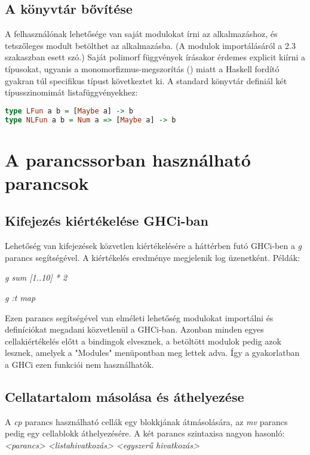 \subsection{A könyvtár bővítése}

A felhasználónak lehetősége van saját modulokat írni az alkalmazáshoz, és tetszőleges modult betölthet az alkalmazásba. (A modulok importálásáról a 2.3 szakaszban esett szó.) Saját polimorf függvények írásakor érdemes explicit kiírni a típusokat, ugyanis a monomorfizmus-megszorítás (\cite{monorestr}) miatt a Haskell fordító gyakran túl specifikus típust következtet ki. A standard könyvtár definiál két típusszinomimát listafüggvényekhez:

\begin{lstlisting}[caption={LFun és NLFun}, language={Haskell},label=src:lfun]
type LFun a b = [Maybe a] -> b
type NLFun a b = Num a => [Maybe a] -> b
\end{lstlisting}

\section{A parancssorban használható parancsok}

\subsection{Kifejezés kiértékelése GHCi-ban}

Lehetőség van kifejezések közvetlen kiértékelésére a háttérben futó GHCi-ben a \textit{g} parancs segítségével. A kiértékelés eredménye megjelenik log üzenetként. Példák:
\begin{compactenum}
	\item \textit{g sum [1..10] * 2}
	\item \textit{g :t map}
\end{compactenum}

Ezen parancs segítségével van elméleti lehetőség modulokat importálni és definíciókat megadani közvetlenül a GHCi-ban. Azonban minden egyes cellakiértékelés előtt a bindingok elvesznek, a betöltött modulok pedig azok lesznek, amelyek a "Modules" menüpontban meg lettek adva. Így a gyakorlatban a GHCi ezen funkciói nem használhatók.

\subsection{Cellatartalom másolása és áthelyezése}

A \textit{cp} parancs használható cellák egy blokkjának átmásolására, az \textit{mv} parancs pedig egy cellablokk áthelyezésére. A két parancs szintaxisa nagyon hasonló: \textit{<parancs> <listahivatkozás> <egyszerű hivatkozás>}


